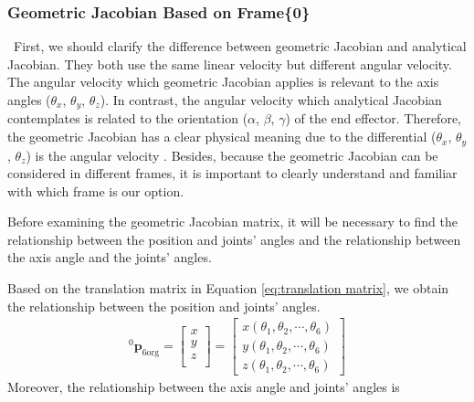 \subsubsection{Geometric Jacobian Based on Frame\{0\}}
\hspace*{6mm}\
First, we should clarify the difference between geometric Jacobian and analytical Jacobian. They both use the same linear velocity but different angular velocity. The angular velocity which geometric Jacobian applies is relevant to the axis angles ($\theta _x$, $\theta _y$, $\theta _z$). In contrast, the angular velocity which analytical Jacobian contemplates is related to the orientation ($\alpha$, $\beta$, $\gamma$) of the end effector. Therefore, the geometric Jacobian has a clear physical meaning due to the differential ($\theta _x$, $\theta _y$, $\theta _z$) is the angular velocity . Besides, because the geometric Jacobian can be considered in different frames, it is important to clearly understand and familiar with which frame is our option.
\par
Before examining the geometric Jacobian matrix, it will be necessary to find the relationship between the position and joints' angles and the relationship between the axis angle and the joints' angles.
\par
Based on the translation matrix in Equation \ref{eq:translation matrix}, we obtain the relationship between the position and joints' angles.
\begin{equation}
\label{eq:lin vel}
\begin{split}
^0\boldsymbol{p}_\mathrm{6org}
= 
\begin{bmatrix}
x\\
y\\
z\\
\end{bmatrix} 
=
\begin{bmatrix}
x(\theta _1, \theta _2, \cdots, \theta _6)\\
y(\theta _1, \theta _2, \cdots, \theta _6)\\
z(\theta _1, \theta _2, \cdots, \theta _6)
\end{bmatrix} 
\end{split}
\end{equation}
Moreover, the relationship between the axis angle and joints' angles is 
